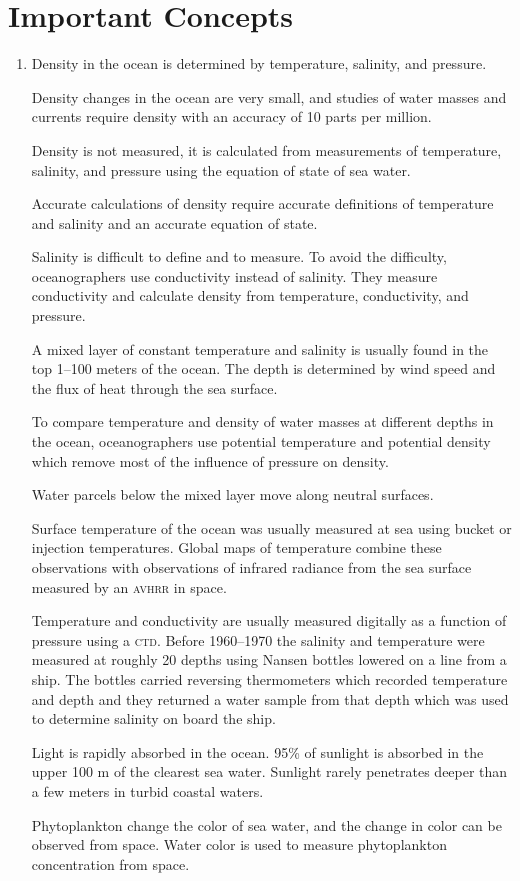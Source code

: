 \section{Important Concepts}
\begin{enumerate}
\item Density in the ocean is determined by temperature, salinity, and
pressure.

\vitem Density changes in the ocean are very small, and studies of
water masses and currents require density with an
accuracy of 10 parts per million.

\vitem Density is not measured, it is calculated from measurements of
temperature, salinity, and pressure using the equation of state of sea
water.

\vitem Accurate calculations of density require accurate definitions
of temperature and salinity and an accurate equation of state.

\vitem Salinity is difficult to define and to measure. To avoid the
difficulty, oceanographers use conductivity instead of salinity. They
measure conductivity and calculate density from temperature,
conductivity, and pressure.

\vitem A mixed layer of constant temperature and
salinity is usually found in the top 1--100 meters of the ocean. The
depth is determined by wind speed and the flux of heat through the sea
surface.

\vitem To compare temperature and density of water masses at different
depths in the ocean, oceanographers use potential temperature and
potential density which remove most of the influence of pressure on
density.

\vitem Water parcels below the mixed layer move
along neutral surfaces.

\vitem Surface temperature of the ocean was usually measured at sea
using bucket or injection temperatures. Global maps of temperature
combine these observations with observations of infrared radiance from
the sea surface measured by an \textsc{avhrr} in space.

\vitem Temperature and conductivity are usually measured digitally as
a function of pressure using a \textsc{ctd}. Before
1960--1970 the salinity and temperature were measured at roughly 20
depths using Nansen bottles lowered on a line from a ship. The bottles
carried reversing thermometers which
recorded temperature and depth and they returned a water sample from
that depth which was used to determine salinity on board the ship.

\vitem Light is rapidly absorbed in the ocean. 95\% of sunlight is
absorbed in the upper 100 m of the clearest sea water. Sunlight rarely
penetrates deeper than a few meters in turbid coastal waters.

\vitem Phytoplankton change the color of sea water, and the change in
color can be observed from space. Water color is used to measure
phytoplankton concentration from space.

\end{enumerate}


